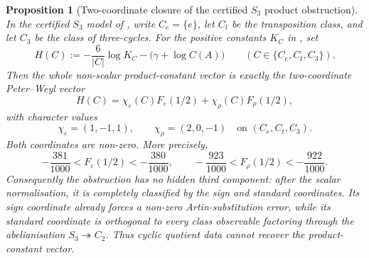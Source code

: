 \documentclass[11pt,a4paper]{amsart}
\theoremstyle{plain}
\newtheorem{proposition}[theorem]{Proposition}
\theoremstyle{definition}
\theoremstyle{remark}
\begin{document}
\begin{proposition}[Two-coordinate closure of the certified \(S_3\)
  product obstruction]
  \label{prop:s3-two-coordinate-product-obstruction-vector}
  \label{prop:s3-two-coordinate-product-obstruction-spine}
  In the certified \(S_3\) model of
  , write
  \(C_e=\{e\}\), let \(C_t\) be the transposition class, and let
  \(C_3\) be the class of three-cycles.  For the positive constants
  \(K_C\) in , set
  \[
    H(C):=-\frac{6}{|C|}\log K_C-\bigl(\gamma+\log C(A)\bigr)
    \qquad(C\in\{C_e,C_t,C_3\}).
  \]
  Then the whole non-scalar product-constant vector is exactly the
  two-coordinate Peter--Weyl vector
  \begin{equation}\label{eq:s3-product-obstruction-vector}
    H(C)=\chi_\varepsilon(C)F_\varepsilon(1/2)
      +\chi_\rho(C)F_\rho(1/2),
  \end{equation}
  with character values
  \[
    \chi_\varepsilon=(1,-1,1),
    \qquad
    \chi_\rho=(2,0,-1)
    \quad\text{on }(C_e,C_t,C_3).
  \]
  Both coordinates are non-zero.  More precisely,
  \[
    -\frac{381}{1000}<F_\varepsilon(1/2)<-\frac{380}{1000},
    \qquad
    -\frac{923}{1000}<F_\rho(1/2)<-\frac{922}{1000}.
  \]
  Consequently the obstruction has no hidden third component: after the
  scalar normalisation, it is completely classified by the sign and
  standard coordinates.  Its sign coordinate already forces a non-zero
  Artin-substitution error, while its standard coordinate is orthogonal to
  every class observable factoring through the abelianisation
  \(S_3\twoheadrightarrow C_2\).  Thus cyclic quotient data cannot recover
  the product-constant vector.
\end{proposition}
\end{document}
